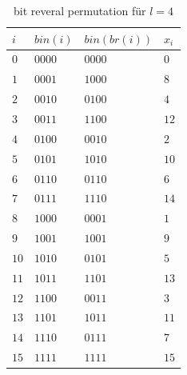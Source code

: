 \documentclass[a4paper,12pt]{article}
\begin{document}
  \begin{table}
 \begin{center}
 \begin{tabular}[c]{|l|l|l|l|}
 	\hline
 	$i$ & $\mathit{bin}\left(i\right)$ &$\mathit{bin}\left(\mathit{br}\left(i\right)\right)$  &$x_i$\\
 	\hline
 	$0$ & $0000$ &$0000$  &$0$\\
 	\hline
 	$1$ & $0001$ &$1000$  &$8$\\
 	\hline
 	$2$ & $0010$ &$0100$  &$4$\\
 	\hline
 	$3$ & $0011$ &$1100$  &$12$\\
 	\hline
 	$4$ & $0100$ &$0010$  &$2$\\
    \hline
 	$5$ & $0101$ &$1010$  &$10$\\
 	\hline
 	$6$ & $0110$ &$0110$  &$6$\\
 	\hline
 	$7$ & $0111$ &$1110$  &$14$\\
    \hline
 	$8$ & $1000$ &$0001$  &$1$\\
 	\hline
 	$9$ & $1001$ &$1001$  &$9$\\
 	\hline
 	$10$& $1010$ &$0101$  &$5$\\
 	\hline
 	$11$& $1011$ &$1101$  &$13$\\
 	\hline
 	$12$ &$1100$ &$0011$  &$3$\\
 	\hline
 	$13$ &$1101$ &$1011$  &$11$\\
 	\hline
 	$14$ &$1110$ &$0111$  &$7$\\
 	\hline
 	$15$ &$1111$ &$1111$  &$15$\\
 	\hline
 \end{tabular}
  	\caption{bit reveral permutation für $l=4$} 
  	\label{tab:bitReversal}
\end{center}
   \end{table}
\end{document}
